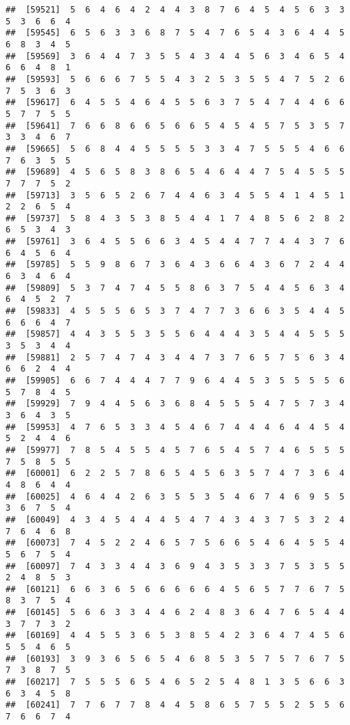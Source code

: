 \documentclass[
]{book}
\begin{document}
\begin{verbatim}
##  [59521]  5  6  4  6  4  2  4  4  3  8  7  6  4  5  4  5  6  3  3  5  3  6  6  4
##  [59545]  6  5  6  3  3  6  8  7  5  4  7  6  5  4  3  6  4  4  5  6  8  3  4  5
##  [59569]  3  6  4  4  7  3  5  5  4  3  4  4  5  6  3  4  6  5  4  6  6  4  8  1
##  [59593]  5  6  6  6  7  5  5  4  3  2  5  3  5  5  4  7  5  2  6  7  5  3  6  3
##  [59617]  6  4  5  5  4  6  4  5  5  6  3  7  5  4  7  4  4  6  6  5  7  7  5  5
##  [59641]  7  6  6  8  6  6  5  6  6  5  4  5  4  5  7  5  3  5  7  3  3  4  6  7
##  [59665]  5  6  8  4  4  5  5  5  5  3  3  4  7  5  5  5  4  6  6  7  6  3  5  5
##  [59689]  4  5  6  5  8  3  8  6  5  4  6  4  4  7  5  4  5  5  5  7  7  7  5  2
##  [59713]  3  5  6  5  2  6  7  4  4  6  3  4  5  5  4  1  4  5  1  2  2  6  5  4
##  [59737]  5  8  4  3  5  3  8  5  4  4  1  7  4  8  5  6  2  8  2  6  5  3  4  3
##  [59761]  3  6  4  5  5  6  6  3  4  5  4  4  7  7  4  4  3  7  6  6  4  5  6  4
##  [59785]  5  5  9  8  6  7  3  6  4  3  6  6  4  3  6  7  2  4  4  6  3  4  6  4
##  [59809]  5  3  7  4  7  4  5  5  8  6  3  7  5  4  4  5  6  3  4  6  4  5  2  7
##  [59833]  4  5  5  5  6  5  3  7  4  7  7  3  6  6  3  5  4  4  5  6  6  6  4  7
##  [59857]  4  4  3  5  5  3  5  5  6  4  4  4  3  5  4  4  5  5  5  3  5  3  4  4
##  [59881]  2  5  7  4  7  4  3  4  4  7  3  7  6  5  7  5  6  3  4  6  6  2  4  4
##  [59905]  6  6  7  4  4  4  7  7  9  6  4  4  5  3  5  5  5  5  6  5  7  8  4  5
##  [59929]  7  9  4  4  5  6  3  6  8  4  5  5  5  4  7  5  7  3  4  3  6  4  3  5
##  [59953]  4  7  6  5  3  3  4  5  4  6  7  4  4  4  6  4  4  5  4  5  2  4  4  6
##  [59977]  7  8  5  4  5  5  4  5  7  6  5  4  5  7  4  6  5  5  5  7  5  8  5  5
##  [60001]  6  2  2  5  7  8  6  5  4  5  6  3  5  7  4  7  3  6  4  4  8  6  4  4
##  [60025]  4  6  4  4  2  6  3  5  5  3  5  4  6  7  4  6  9  5  5  3  6  7  5  4
##  [60049]  4  3  4  5  4  4  4  5  4  7  4  3  4  3  7  5  3  2  4  7  6  4  6  8
##  [60073]  7  4  5  2  2  4  6  5  7  5  6  6  5  4  6  4  5  5  4  5  6  7  5  4
##  [60097]  7  4  3  3  4  4  3  6  9  4  3  5  3  3  7  5  3  5  5  2  4  8  5  3
##  [60121]  6  6  3  6  5  6  6  6  6  6  4  5  6  5  7  7  6  7  5  8  3  7  5  4
##  [60145]  5  6  6  3  3  4  4  6  2  4  8  3  6  4  7  6  5  4  4  3  7  7  3  2
##  [60169]  4  4  5  5  3  6  5  3  8  5  4  2  3  6  4  7  4  5  6  5  5  4  6  5
##  [60193]  3  9  3  6  5  6  5  4  6  8  5  3  5  7  5  7  6  7  5  7  3  8  7  5
##  [60217]  7  5  5  5  6  5  4  6  5  2  5  4  8  1  3  5  6  6  3  6  3  4  5  8
##  [60241]  7  7  6  7  7  8  4  4  5  8  6  5  7  5  5  2  5  5  6  7  6  6  7  4

\end{verbatim}
\end{document}
